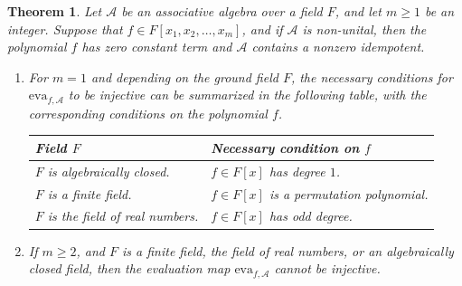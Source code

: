 \documentclass{amsart}
\newtheorem{theorem}{Theorem}[section]
\theoremstyle{definition}
\begin{document}
	\begin{theorem}\label{variable1}
		Let \( \mathcal{A} \) be an associative algebra over a field \( F \), and let \( m \geq 1 \) be an integer. Suppose that \( f \in F[x_1, x_2, \ldots, x_m] \), and if \( \mathcal{A} \) is non-unital, then the polynomial \( f \) has zero constant term and \( \mathcal{A} \) contains a nonzero idempotent. 
		\begin{enumerate}[\rm (i)]
			\item For \(m=1\) and depending on the ground field \(F\), the necessary conditions for \(\mathrm{eva}_{f,\mathcal{A}}\) to be injective can be summarized in the following table,  with the corresponding conditions on the polynomial \(f\).
			
			\begin{longtable}{p{0.45\textwidth} p{}}
				\toprule
				\textbf{Field \(F\)} & \textbf{Necessary condition on \(f\)} \\
				\midrule
				\(F\) is algebraically closed. & \(f \in F[x]\) has degree \(1\). \\
				\(F\) is a finite field.          & \(f\in F[x]\) is a permutation polynomial. \\
				\(F\) is the field of real numbers.      & $f\in F[x]$ has odd degree. \\
				\bottomrule
			\end{longtable}
			\item 	If $m\geq2$, and \( F \) is a finite field, the field of real numbers, or an algebraically closed field, then the evaluation map \( \mathrm{eva}_{f,\mathcal{A}} \) cannot be injective.
		\end{enumerate}
	\end{theorem}
	
\end{document}
